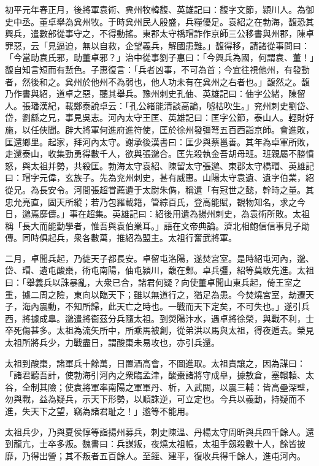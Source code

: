 \begin{pinyinscope}
初平元年春正月，後將軍袁術、兾州牧韓馥、英雄記曰：馥字文節，潁川人。為御史中丞。董卓舉為兾州牧。于時兾州民人殷盛，兵糧優足。袁紹之在勃海，馥恐其興兵，遣數部從事守之，不得動搖。東郡太守橋瑁詐作京師三公移書與州郡，陳卓罪惡，云「見逼迫，無以自救，企望義兵，解國患難。」馥得移，請諸從事問曰：「今當助袁氏邪，助董卓邪？」治中從事劉子惠曰：「今興兵為國，何謂袁、董！」馥自知言短而有慙色。子惠復言：「兵者凶事，不可為首；今宜往視他州，有發動者，然後和之。兾州於他州不為弱也，他人功未有在兾州之右者也。」馥然之。馥乃作書與紹，道卓之惡，聽其舉兵。豫州刺史孔伷、英雄記曰：伷字公緒，陳留人。張璠漢紀，載鄭泰說卓云：「孔公緒能清談高論，噓枯吹生。」兖州刺史劉岱、岱，劉繇之兄，事見吳志。河內太守王匡、英雄記曰：匡字公節，泰山人。輕財好施，以任俠聞。辟大將軍何進府進符使，匡於徐州發彊弩五百西詣京師。會進敗，匡還鄉里。起家，拜河內太守。謝承後漢書曰：匡少與蔡邕善。其年為卓軍所敗，走還泰山，收集勁勇得數千人，欲與張邈合。匡先殺執金吾胡母班。班親屬不勝憤怒，與太祖并勢，共殺匡。勃海太守袁紹、陳留太守張邈、東郡太守橋瑁、英雄記曰：瑁字元偉，玄族子。先為兖州刺史，甚有威惠。山陽太守袁遺、遺字伯業，紹從兄。為長安令。河間張超甞薦遺于太尉朱儁，稱遺「有冠世之懿，幹時之量。其忠允亮直，固天所縱；若乃包羅載籍，管綜百氏，登高能賦，覩物知名，求之今日，邈焉靡儔。」事在超集。英雄記曰：紹後用遺為揚州刺史，為袁術所敗。太祖稱「長大而能勤學者，惟吾與袁伯業耳。」語在文帝典論。濟北相鮑信信事見子勛傳。同時俱起兵，衆各數萬，推紹為盟主。太祖行奮武將軍。

二月，卓聞兵起，乃徙天子都長安。卓留屯洛陽，遂焚宮室。是時紹屯河內，邈、岱、瑁、遺屯酸棗，術屯南陽，伷屯潁川，馥在鄴。卓兵彊，紹等莫敢先進。太祖曰：「舉義兵以誅暴亂，大衆已合，諸君何疑？向使董卓聞山東兵起，倚王室之重，據二周之險，東向以臨天下；雖以無道行之，猶足為患。今焚燒宮室，劫遷天子，海內震動，不知所歸，此天亡之時也。一戰而天下定矣，不可失也。」遂引兵西，將據成臯。邈遣將衞茲分兵隨太祖。到熒陽汴水，遇卓將徐榮，與戰不利，士卒死傷甚多。太祖為流矢所中，所乘馬被創，從弟洪以馬與太祖，得夜遁去。榮見太祖所將兵少，力戰盡日，謂酸棗未易攻也，亦引兵還。

太祖到酸棗，諸軍兵十餘萬，日置酒高會，不圖進取。太祖責讓之，因為謀曰：「諸君聽吾計，使勃海引河內之衆臨孟津，酸棗諸將守成臯，據敖倉，塞轘轅、太谷，全制其險；使袁將軍率南陽之軍軍丹、析，入武關，以震三輔：皆高壘深壁，勿與戰，益為疑兵，示天下形勢，以順誅逆，可立定也。今兵以義動，持疑而不進，失天下之望，竊為諸君耻之！」邈等不能用。

太祖兵少，乃與夏侯惇等詣揚州募兵，刺史陳溫、丹楊太守周昕與兵四千餘人。還到龍亢，士卒多叛。魏書曰：兵謀叛，夜燒太祖帳，太祖手劔殺數十人，餘皆披靡，乃得出營；其不叛者五百餘人。至銍、建平，復收兵得千餘人，進屯河內。


\end{pinyinscope}

